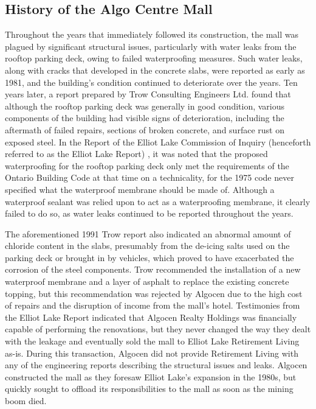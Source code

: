 \documentclass[12pt]{article}
\begin{document}
\subsection{History of the Algo Centre Mall}

Throughout the years that immediately followed its construction, the mall was plagued by significant structural issues, particularly with water leaks from the rooftop parking deck, owing to failed waterproofing measures. Such water leaks, along with cracks that developed in the concrete slabs, were reported as early as 1981, and the building's condition continued to deteriorate over the years. Ten years later, a report prepared by Trow Consulting Engineers Ltd. found that although the rooftop parking deck was generally in good condition, various components of the building had visible signs of deterioration, including the aftermath of failed repairs, sections of broken concrete, and surface rust on exposed steel. In the Report of the Elliot Lake Commission of Inquiry (henceforth referred to as the Elliot Lake Report) \cite{AlgoLakeReport1}, it was noted that the proposed waterproofing for the rooftop parking deck only met the requirements of the Ontario Building Code at that time on a technicality, for the 1975 code never specified what the waterproof membrane should be made of. Although a waterproof sealant was relied upon to act as a waterproofing membrane, it clearly failed to do so, as water leaks continued to be reported throughout the years. 

The aforementioned 1991 Trow report also indicated an abnormal amount of chloride content in the slabs, presumably from the de-icing salts used on the parking deck or brought in by vehicles, which proved to have exacerbated the corrosion of the steel components. Trow recommended the installation of a new waterproof membrane and a layer of asphalt to replace the existing concrete topping, but this recommendation was rejected by Algocen due to the high cost of repairs and the disruption of income from the mall's hotel. Testimonies from the Elliot Lake Report indicated that Algocen Realty Holdings was financially capable of performing the renovations, but they never changed the way they dealt with the leakage and eventually sold the mall to Elliot Lake Retirement Living as-is. During this transaction, Algocen did not provide Retirement Living with any of the engineering reports describing the structural issues and leaks. Algocen constructed the mall as they foresaw Elliot Lake's expansion in the 1980s, but quickly sought to offload its responsibilities to the mall as soon as the mining boom died. 
\end{document}
